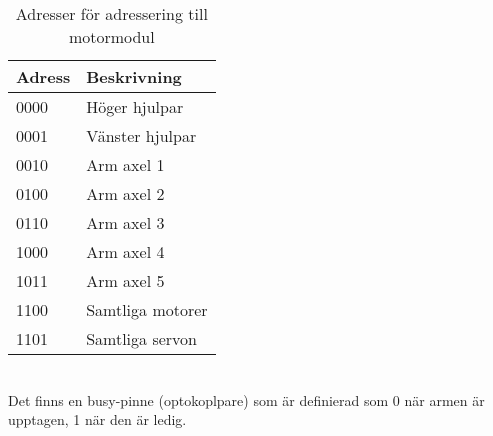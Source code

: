 \begin{table}[h]
	\centering
		\begin{tabularx}{\textwidth}{| l | X |}
			\hline
			\textbf{Adress} & \textbf{Beskrivning} \\
			\hline
			{0000} & {Höger hjulpar} \\
			\hline
			{0001} & {Vänster hjulpar} \\
			\hline
			{0010} & {Arm axel 1} \\ %
			\hline
			{0100} & {Arm axel 2} \\
			\hline
			{0110} & {Arm axel 3} \\
			\hline
			{1000} & {Arm axel 4} \\
			\hline
			{1011} & {Arm axel 5} \\ %
			\hline
			{1100} & {Samtliga motorer} \\
			\hline
			{1101} & {Samtliga servon} \\
			\hline
		\end{tabularx}
	\caption{Adresser för adressering till motormodul} \label{protokoll:pc-motor-adress-tabell}
\end{table}
 \\


Det finns en busy-pinne (optokoplpare) som är definierad som 0 när armen är upptagen, 1 när den är ledig. 